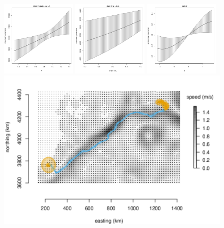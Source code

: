 \documentclass[12pt]{article}\usepackage[]{graphicx}\usepackage[]{xcolor}
\begin{document}
\begin{figure}[htbp]
  \centering
  \includegraphics[width=0.32\textwidth]{plot_turtleResults001.pdf}
  \includegraphics[width=0.32\textwidth]{plot_turtleResults002.pdf}
  \includegraphics[width=0.32\textwidth]{plot_turtleResults004.pdf}
    \includegraphics[width=\textwidth]{plot_turtleResults2.pdf}

\end{figure}
\end{document}
